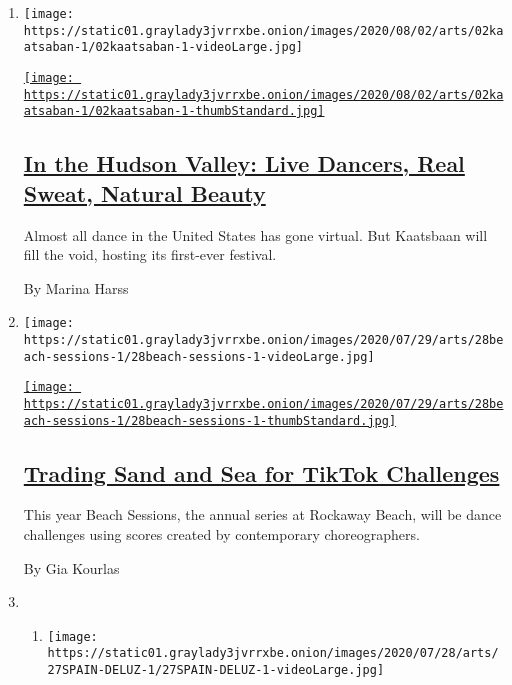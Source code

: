\begin{enumerate}
\def\labelenumi{\arabic{enumi}.}
\item
  \texttt{[image: https://static01.graylady3jvrrxbe.onion/images/2020/08/02/arts/02kaatsaban-1/02kaatsaban-1-videoLarge.jpg]}

  \href{/2020/07/29/arts/dance/kaatsbaan-dance-festival-stella-abrera.html}{\texttt{[image: https://static01.graylady3jvrrxbe.onion/images/2020/08/02/arts/02kaatsaban-1/02kaatsaban-1-thumbStandard.jpg]}}

  \hypertarget{in-the-hudson-valley-live-dancers-real-sweat-natural-beauty}{%
  \subsection{\texorpdfstring{\href{/2020/07/29/arts/dance/kaatsbaan-dance-festival-stella-abrera.html}{In
  the Hudson Valley: Live Dancers, Real Sweat, Natural
  Beauty}}{In the Hudson Valley: Live Dancers, Real Sweat, Natural Beauty}}\label{in-the-hudson-valley-live-dancers-real-sweat-natural-beauty}}

  Almost all dance in the United States has gone virtual. But Kaatsbaan
  will fill the void, hosting its first-ever festival.

  By Marina Harss
\item
  \texttt{[image: https://static01.graylady3jvrrxbe.onion/images/2020/07/29/arts/28beach-sessions-1/28beach-sessions-1-videoLarge.jpg]}

  \href{/2020/07/28/arts/dance/beach-sessions-rockaway-tiktok.html}{\texttt{[image: https://static01.graylady3jvrrxbe.onion/images/2020/07/29/arts/28beach-sessions-1/28beach-sessions-1-thumbStandard.jpg]}}

  \hypertarget{trading-sand-and-sea-for-tiktok-challenges}{%
  \subsection{\texorpdfstring{\href{/2020/07/28/arts/dance/beach-sessions-rockaway-tiktok.html}{Trading
  Sand and Sea for TikTok
  Challenges}}{Trading Sand and Sea for TikTok Challenges}}\label{trading-sand-and-sea-for-tiktok-challenges}}

  This year Beach Sessions, the annual series at Rockaway Beach, will be
  dance challenges using scores created by contemporary choreographers.

  By Gia Kourlas
\item
  \begin{enumerate}
  \def\labelenumii{\arabic{enumii}.}
  \item
    \texttt{[image: https://static01.graylady3jvrrxbe.onion/images/2020/07/28/arts/27SPAIN-DELUZ-1/27SPAIN-DELUZ-1-videoLarge.jpg]}


\end{enumerate}
\end{enumerate}
